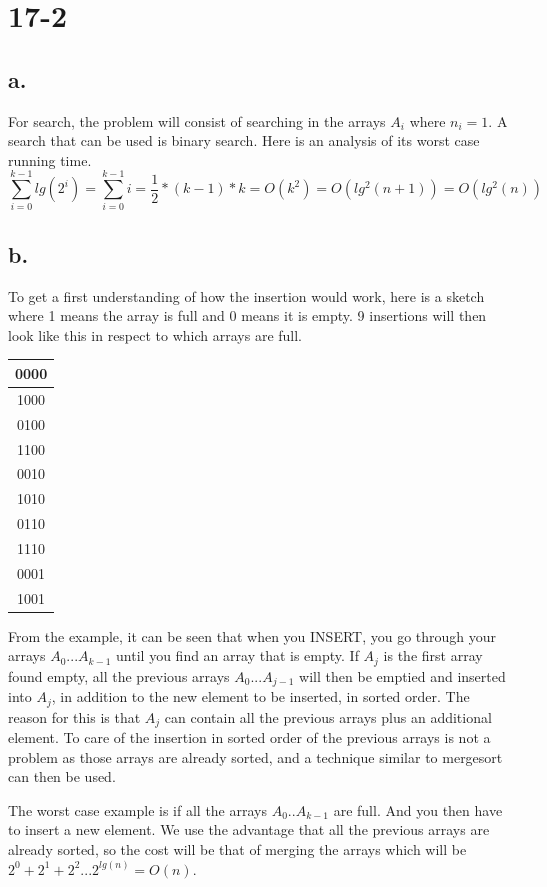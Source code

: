 \documentclass[12pt,a4paper]{report}
\begin{document}
\section*{17-2}
\subsection*{a.}
For search, the problem will consist of searching in the arrays $A_i$ where $n_i = 1$.
A search that can be used is binary search.
Here is an analysis of its worst case running time.
$$\sum\limits_{i=0}^{k-1} lg(2^i) = \sum\limits_{i=0}^{k-1} i = \frac{1}{2} * (k-1) * k = O(k^2) = O(lg^2(n+1)) = O(lg^2(n))$$

\subsection*{b.}
To get a first understanding of how the insertion would work, here is a sketch where 1 means the array is full and 0 means it is empty.
9 insertions will then look like this in respect to which arrays are full.

\begin{tabular}{|c|}
\hline 
0000 \\ 
\hline 
1000 \\ 
\hline 
0100 \\ 
\hline 
1100 \\ 
\hline 
0010 \\ 
\hline 
1010 \\ 
\hline 
0110 \\ 
\hline 
1110 \\ 
\hline 
0001 \\ 
\hline 
1001 \\ 
\hline 
\end{tabular}

From the example, it can be seen that when you INSERT, you go through your arrays $A_0 ... A_{k-1}$ until you find an array that is empty. If $A_j$ is the first array found empty, all the previous arrays $A_0 ... A_{j-1}$ will then be emptied and inserted into $A_j$, in addition to the new element to be inserted, in sorted order. The reason for this is that $A_j$ can contain all the previous arrays plus an additional element. To care of the insertion in sorted order of the previous arrays is not a problem as those arrays are already sorted, and a technique similar to mergesort can then be used.

The worst case example is if all the arrays $A_0 .. A_{k-1}$ are full. And you then have to insert a new element.
We use the advantage that all the previous arrays are already sorted, so the cost will be that of merging the arrays which will be $2^0 + 2^1 + 2^2 ... 2^{lg(n)} = O(n)$.
\end{document}

